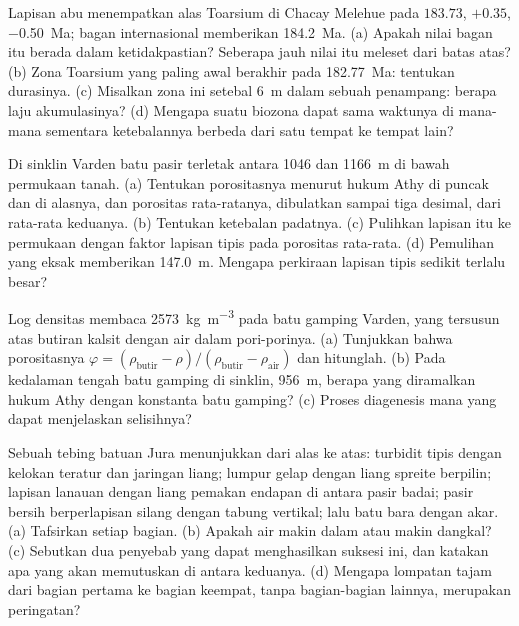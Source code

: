 \begin{exercise}[$\star\star$]\label{exo:b2:palaeoenvironments:6}
Lapisan abu menempatkan alas Toarsium di Chacay Melehue pada $183.73$, $+0.35$, \qty{-0.50}{Ma};
bagan internasional memberikan \qty{184.2}{Ma}. (a) Apakah nilai bagan itu berada dalam ketidakpastian?
Seberapa jauh nilai itu meleset dari batas atas? (b) Zona Toarsium yang paling awal berakhir pada
\qty{182.77}{Ma}: tentukan durasinya. (c) Misalkan zona ini setebal \qty{6}{m} dalam sebuah penampang:
berapa laju akumulasinya? (d) Mengapa suatu biozona dapat sama waktunya di mana-mana sementara
ketebalannya berbeda dari satu tempat ke tempat lain?
\end{exercise}

\begin{exercise}[$\star\star$]\label{exo:b2:palaeoenvironments:7}
Di sinklin Varden batu pasir terletak antara 1046 dan \qty{1166}{m} di bawah permukaan tanah. (a)
Tentukan porositasnya menurut hukum Athy di puncak dan di alasnya, dan porositas rata-ratanya, dibulatkan sampai
tiga desimal, dari rata-rata keduanya. (b) Tentukan ketebalan padatnya. (c) Pulihkan lapisan itu ke
permukaan dengan faktor lapisan tipis pada porositas rata-rata. (d) Pemulihan yang eksak memberikan
\qty{147.0}{m}. Mengapa perkiraan lapisan tipis sedikit terlalu besar?
\end{exercise}

\begin{exercise}[$\star\star$]\label{exo:b2:palaeoenvironments:8}
Log densitas membaca \qty{2573}{kg.m^{-3}} pada batu gamping Varden, yang tersusun atas butiran kalsit dengan
air dalam pori-porinya. (a) Tunjukkan bahwa porositasnya $\varphi = (\rho_{\text{butir}} -
\rho)/(\rho_{\text{butir}} - \rho_{\text{air}})$ dan hitunglah. (b) Pada kedalaman tengah
batu gamping di sinklin, \qty{956}{m}, berapa yang diramalkan hukum Athy dengan konstanta batu gamping?
(c) Proses diagenesis mana yang dapat menjelaskan selisihnya?
\end{exercise}

\begin{exercise}[$\star\star$]\label{exo:b2:palaeoenvironments:9}
Sebuah tebing batuan Jura menunjukkan dari alas ke atas: turbidit tipis dengan kelokan teratur dan jaringan
liang; lumpur gelap dengan liang spreite berpilin; lapisan lanauan dengan liang pemakan endapan di antara
pasir badai; pasir bersih berperlapisan silang dengan
tabung vertikal; lalu batu bara dengan akar. (a) Tafsirkan setiap bagian. (b) Apakah air makin dalam atau
makin dangkal? (c) Sebutkan dua penyebab yang dapat menghasilkan suksesi ini, dan katakan apa yang akan memutuskan
di antara keduanya. (d) Mengapa lompatan tajam dari bagian pertama ke bagian keempat, tanpa bagian-bagian lainnya, merupakan
peringatan?
\end{exercise}

